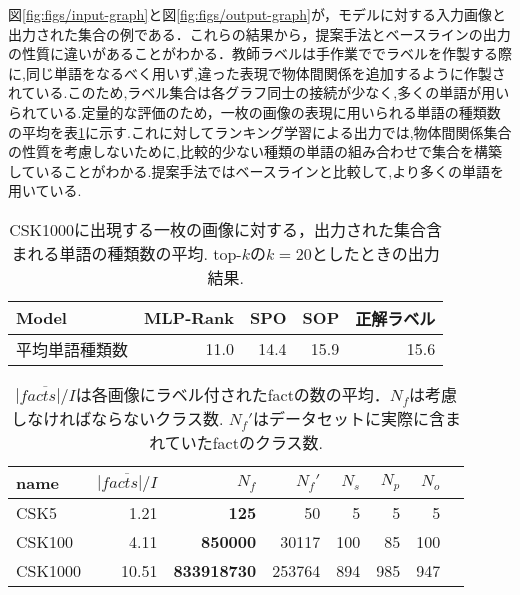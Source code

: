 図\ref{fig:figs/input-graph}と図\ref{fig:figs/output-graph}が，モデルに対する入力画像と出力された集合の例である．これらの結果から，提案手法とベースラインの出力の性質に違いがあることがわかる．教師ラベルは手作業ででラベルを作製する際に,同じ単語をなるべく用いず,違った表現で物体間関係を追加するように作製されている.このため,ラベル集合は各グラフ同士の接続が少なく,多くの単語が用いられている.定量的な評価のため，一枚の画像の表現に用いられる単語の種類数の平均を表\ref{table:mean-used-words}に示す.これに対してランキング学習による出力では,物体間関係集合の性質を考慮しないために,比較的少ない種類の単語の組み合わせで集合を構築していることがわかる.提案手法ではベースラインと比較して,より多くの単語を用いている.
\begin{table}
\begin{center}
\caption{CSK1000に出現する一枚の画像に対する，出力された集合含まれる単語の種類数の平均. top-$k$の$k=20$としたときの出力結果.}
\label{table:mean-used-words}
\begin{tabular}{lrrrr}
\toprule
Model & MLP-Rank& SPO &  SOP & 正解ラベル\\
\midrule
平均単語種類数	& 11.0 	& 14.4 & 15.9 & 15.6\\
\bottomrule
\end{tabular}
\end{center}
\end{table}
\begin{table}
\begin{center}
\caption{$\overline{|facts|/I}$は各画像にラベル付されたfactの数の平均．$N_f$は考慮しなければならないクラス数. $N_f'$はデータセットに実際に含まれていたfactのクラス数.}
\label{table:dataset-stats}
\begin{tabular}{lrrrrrrr}
\toprule
name &      $\overline{|facts|/I}$ &  $N_f$ &  $N_f'$ &  $N_s$ &  $N_p$ &  $N_o$ \\
\midrule
CSK5              &   1.21 &             \textbf{125} &       50 &           5 &             5 &          5 \\
CSK100            &   4.11 &       \textbf{850000} &    30117 &         100 &            85 &        100 \\
CSK1000           &  10.51 &       \textbf{833918730} &   253764 &         894 &           985 &        947 \\
\bottomrule
\end{tabular}
\end{center}
\end{table}
